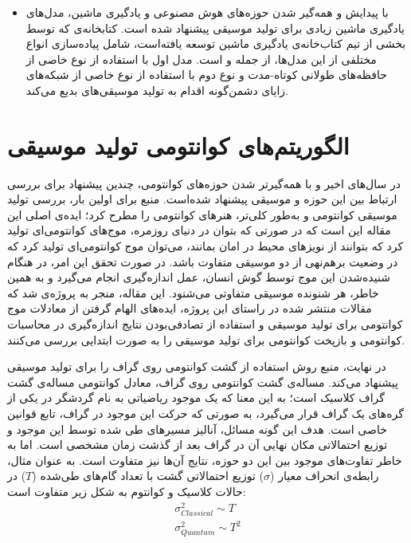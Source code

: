 \begin{itemize}
\item 
با پیدایش و همه‌گیر شدن حوزه‌های هوش مصنوعی و یادگیری ماشین، مدل‌های یادگیری ماشین زیادی برای تولید موسیقی پیشنهاد شده است.
کتابخانه‌ی 
که توسط بخشی از تیم کتاب‌خانه‌ی یادگیری ماشین
توسعه یافته‌است، شامل پیاده‌سازی انواع مختلفی از این مدل‌ها، از جمله
\cite{magenta_melodyrnn}
و
\cite{magenta_gansynth}
است. مدل اول با استفاده از نوع خاصی از حافظه‌های طولانی کوتاه-مدت
و نوع دوم با استفاده از نوع خاصی از شبکه‌های زایای دشمن‌گونه اقدام به تولید موسیقی‌های بدیع می‌کند.
\end{itemize}

\section{الگوریتم‌های کوانتومی تولید موسیقی}

در سال‌های اخیر و با همه‌گیرتر شدن حوزه‌های کوانتومی، چندین پیشنهاد برای بررسی ارتباط بین این حوزه و موسیقی پیشنهاد شده‌است. منبع
\cite{Putz_quantum_music}
برای اولین بار، بررسی تولید موسیقی کوانتومی و به‌طور کلی‌تر، هنرهای کوانتومی را مطرح کرد؛ ایده‌ی اصلی این مقاله این است که در صورتی که بتوان در دنیای روزمره، موج‌های کوانتومی‌ای تولید کرد که بتوانند از نویزهای محیط در امان بمانند، می‌توان موج کوانتومی‌ای تولید کرد که در وضعیت برهم‌نهی از دو موسیقی متفاوت باشد. در صورت تحقق این امر، در هنگام شنیده‌شدن این موج توسط گوش انسان، عمل اندازه‌گیری انجام می‌گیرد و به همین خاطر، هر شنونده موسیقی متفاوتی می‌شنود.
این مقاله، منجر به پروژه‌ی
\cite{quantum_music_event}
شد که مقالات منتشر شده در راستای این پروژه، ایده‌های الهام گرفتن از معادلات موج کوانتومی برای تولید موسیقی
\cite{Helweg_QInspired_Music}
و استفاده از تصادفی‌بودن نتایج اندازه‌گیری در محاسبات کوانتومی و بازپخت کوانتومی برای تولید موسیقی
\cite{Kirke_QC_Music}
را به صورت ابتدایی بررسی می‌کنند.

در نهایت، منبع
\cite{miranda}
روش استفاده از گشت کوانتومی روی گراف را
برای تولید موسیقی پیشنهاد می‌کند.
مساله‌ی گشت کوانتومی روی گراف، معادل کوانتومی مساله‌ی گشت گراف کلاسیک است؛ به این معنا که یک موجود ریاضیاتی به نام گردشگر در یکی از گره‌های یک گراف قرار می‌گیرد، به صورتی که حرکت این موجود در گراف، تابع قوانین خاصی است. هدف این گونه مسائل، آنالیز مسیرهای طی شده توسط این موجود و توزیع احتمالاتی مکان نهایی آن در گراف بعد از گذشت زمان مشخصی است.
اما به خاطر تفاوت‌های موجود بین این دو حوزه، نتایج آن‌ها نیز متفاوت است.
\cite{Kempe_qwalk}
به عنوان مثال، رابطه‌ی انحراف معیار ($\sigma$)
توزیع احتمالاتی گشت با تعداد گام‌های طی‌شده
($T$)
در حالات کلاسیک و کوانتوم به شکل زیر متفاوت است:
\begin{equation}
\begin{gathered}
    \sigma^2_{Classical} \sim T \\[3pt]
    \sigma^2_{Quantum} \sim T^2
\end{gathered}
\end{equation}

